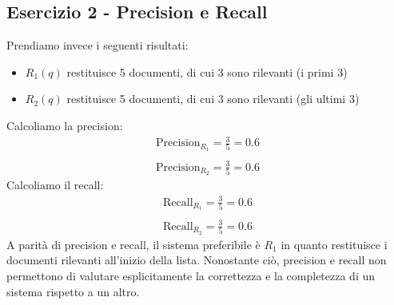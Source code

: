 \documentclass{report}
\begin{document}
	\subsection*{Esercizio 2 - Precision e Recall}
	Prendiamo invece i seguenti risultati:
	\begin{itemize}
		\item $R_{1}(q)$ restituisce 5 documenti, di cui 3 sono rilevanti (i primi 3)
		\item $R_{2}(q)$ restituisce 5 documenti, di cui 3 sono rilevanti (gli ultimi 3)
	\end{itemize}
	Calcoliamo la precision:
	\[
		\begin{array}{l}
			\text{Precision}_{R_{1}} = \frac{3}{5} = 0.6\\\\
			\text{Precision}_{R_{2}} = \frac{3}{5} = 0.6
		\end{array}
	\]
	Calcoliamo il recall:
	\[
		\begin{array}{l}
			\text{Recall}_{R_{1}} = \frac{3}{5} = 0.6\\\\
			\text{Recall}_{R_{2}} = \frac{3}{5} = 0.6
		\end{array}
	\]
	A parità di precision e recall, il sistema preferibile è $R_{1}$ in quanto restituisce i documenti rilevanti all'inizio della lista. Nonostante ciò, precision e recall non permettono di valutare esplicitamente la correttezza e la completezza di un sistema rispetto a un altro.
\end{document}
